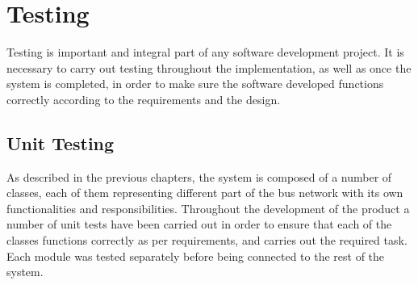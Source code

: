 \chapter{Testing}
Testing is important and integral part of any software development project. It is necessary to carry out testing throughout the implementation, as well as once the system is completed, in order to make sure the software developed functions correctly according to the requirements and the design.

\section{Unit Testing} 
As described in the previous chapters, the system is composed of a number of classes, each of them representing different part of the bus network with its own functionalities and responsibilities. Throughout the development of the product a number of unit tests have been carried out in order to ensure that each of the classes functions correctly as per requirements, and carries out the required task. Each module was tested separately before being connected to the rest of the system.

